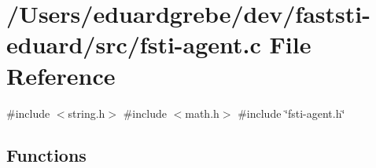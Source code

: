 \hypertarget{fsti-agent_8c}{}\section{/\+Users/eduardgrebe/dev/faststi-\/eduard/src/fsti-\/agent.c File Reference}
\label{fsti-agent_8c}
{\ttfamily \#include $<$string.\+h$>$}\newline
{\ttfamily \#include $<$math.\+h$>$}\newline
{\ttfamily \#include \char`\"{}fsti-\/agent.\+h\char`\"{}}\newline
\subsection*{Functions}

